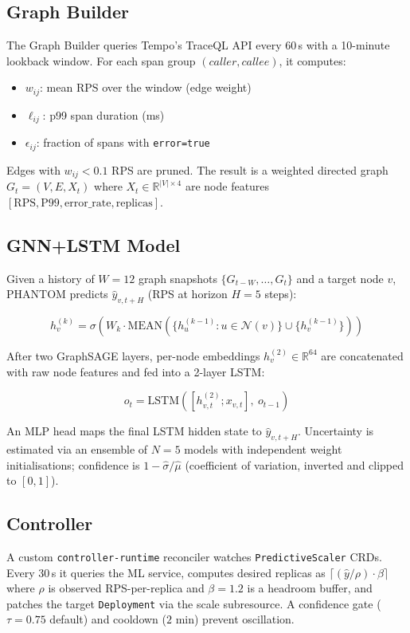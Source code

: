 \documentclass[sigconf,nonacm]{acmart}
\begin{document}
\subsection{Graph Builder}
The Graph Builder queries Tempo's TraceQL API every 60\,s with a 10-minute lookback window.
For each span group $(caller, callee)$, it computes:
\begin{itemize}
  \item $w_{ij}$: mean RPS over the window (edge weight)
  \item $\ell_{ij}$: p99 span duration (ms)
  \item $\epsilon_{ij}$: fraction of spans with \texttt{error=true}
\end{itemize}
Edges with $w_{ij} < 0.1$ RPS are pruned. The result is a weighted directed graph $G_t = (V, E, X_t)$ where $X_t \in \mathbb{R}^{|V| \times 4}$ are node features $[\text{RPS}, \text{P99}, \text{error\_rate}, \text{replicas}]$.

\subsection{GNN+LSTM Model}
Given a history of $W=12$ graph snapshots $\{G_{t-W}, \ldots, G_t\}$ and a target node $v$, PHANTOM predicts $\hat{y}_{v, t+H}$ (RPS at horizon $H=5$ steps):

\begin{equation}
  h_v^{(k)} = \sigma\!\left(W_k \cdot \text{MEAN}\!\left(\{h_u^{(k-1)} : u \in \mathcal{N}(v)\} \cup \{h_v^{(k-1)}\}\right)\right)
\end{equation}

After two GraphSAGE layers, per-node embeddings $h_v^{(2)} \in \mathbb{R}^{64}$ are concatenated with raw node features and fed into a 2-layer LSTM:

\begin{equation}
  o_t = \text{LSTM}([h_{v,t}^{(2)}; x_{v,t}],\ o_{t-1})
\end{equation}

An MLP head maps the final LSTM hidden state to $\hat{y}_{v,t+H}$.
Uncertainty is estimated via an ensemble of $N=5$ models with independent weight initialisations; confidence is $1 - \hat{\sigma}/\hat{\mu}$ (coefficient of variation, inverted and clipped to $[0,1]$).

\subsection{Controller}
A custom \texttt{controller-runtime} reconciler watches \texttt{PredictiveScaler} CRDs.
Every 30\,s it queries the ML service, computes desired replicas as $\lceil (\hat{y} / \rho) \cdot \beta \rceil$ where $\rho$ is observed RPS-per-replica and $\beta=1.2$ is a headroom buffer, and patches the target \texttt{Deployment} via the scale subresource.
A confidence gate ($\tau=0.75$ default) and cooldown ($2$ min) prevent oscillation.
\end{document}
